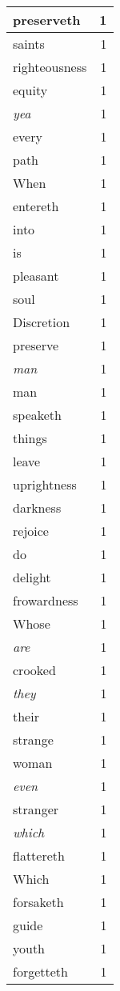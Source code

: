 \begin{center}
\begin{longtable}{l|r}
preserveth & 1\\ \hline 
saints & 1\\ \hline 
righteousness & 1\\ \hline 
equity & 1\\ \hline 
\emph{yea} & 1\\ \hline 
every & 1\\ \hline 
path & 1\\ \hline 
When & 1\\ \hline 
entereth & 1\\ \hline 
into & 1\\ \hline 
is & 1\\ \hline 
pleasant & 1\\ \hline 
soul & 1\\ \hline 
Discretion & 1\\ \hline 
preserve & 1\\ \hline 
\emph{man} & 1\\ \hline 
man & 1\\ \hline 
speaketh & 1\\ \hline 
things & 1\\ \hline 
leave & 1\\ \hline 
uprightness & 1\\ \hline 
darkness & 1\\ \hline 
rejoice & 1\\ \hline 
do & 1\\ \hline 
delight & 1\\ \hline 
frowardness & 1\\ \hline 
Whose & 1\\ \hline 
\emph{are} & 1\\ \hline 
crooked & 1\\ \hline 
\emph{they} & 1\\ \hline 
their & 1\\ \hline 
strange & 1\\ \hline 
woman & 1\\ \hline 
\emph{even} & 1\\ \hline 
stranger & 1\\ \hline 
\emph{which} & 1\\ \hline 
flattereth & 1\\ \hline 
Which & 1\\ \hline 
forsaketh & 1\\ \hline 
guide & 1\\ \hline 
youth & 1\\ \hline 
forgetteth & 1\\ \hline 

\end{longtable}
\end{center}
